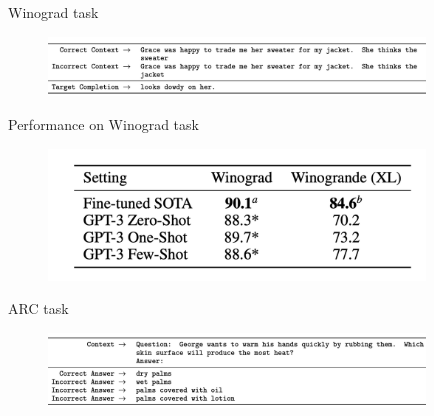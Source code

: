 
\begin{vbframe}{Winograd task}

\vfill

	\begin{figure}
		\centering
		\includegraphics[width=10cm]{figure/winogradformat.png}
	\end{figure}

\vfill

\end{vbframe}



\begin{vbframe}{Performance on Winograd task}

\vfill

	\begin{figure}
		\centering
		\includegraphics[width=10cm]{figure/winogradperf.png}
	\end{figure}

\vfill

\end{vbframe}



\begin{vbframe}{ARC task}

\vfill

	\begin{figure}
		\centering
		\includegraphics[width=10cm]{figure/arcformat.png}
	\end{figure}

\vfill

\end{vbframe}


